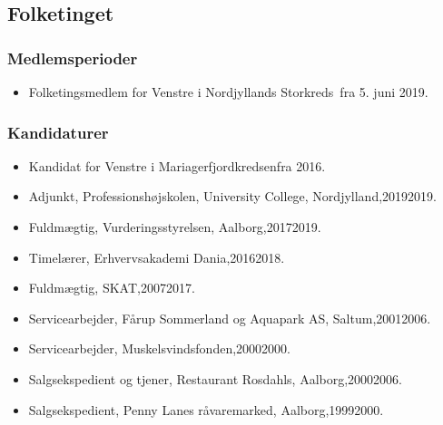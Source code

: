 \documentclass[11pt, a4paper]{awesome-cv}
\begin{document}
\begin{cvletter}
\subsection*{Folketinget}
\subsubsection*{Medlemsperioder}
\begin{itemize}
\item Folketingsmedlem for Venstre i Nordjyllands Storkreds fra 5. juni 2019.
\end{itemize}
\subsubsection*{Kandidaturer}
\begin{itemize}
\item Kandidat for Venstre i Mariagerfjordkredsenfra 2016.
\end{itemize}
\begin{itemize}
\item Adjunkt, Professionshøjskolen, University College, Nordjylland,20192019.
\item Fuldmægtig, Vurderingsstyrelsen, Aalborg,20172019.
\item Timelærer, Erhvervsakademi Dania,20162018.
\item Fuldmægtig, SKAT,20072017.
\item Servicearbejder, Fårup Sommerland og Aquapark AS, Saltum,20012006.
\item Servicearbejder, Muskelsvindsfonden,20002000.
\item Salgsekspedient og tjener, Restaurant Rosdahls, Aalborg,20002006.
\item Salgsekspedient, Penny Lanes råvaremarked, Aalborg,19992000.
\end{itemize}
\end{cvletter}
\end{document}
